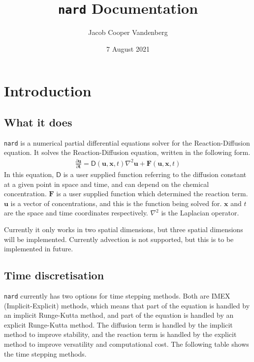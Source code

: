 \documentclass[11pt]{article}
\title{\texttt{nard} Documentation}
\author{Jacob Cooper Vandenberg}
\date{7 August 2021}
\begin{document}
    \maketitle
    \tableofcontents


    \section[Introduction]{Introduction}
    \subsection[What it does]{What it does}
    \texttt{nard} is a numerical partial differential equations solver for the Reaction-Diffusion equation.
    It solves the Reaction-Diffusion equation, written in the following form.
    \begin{gather}
        \frac{\partial \mathbf{u} }{\partial \mathbf{t}} = \mathsf{D}(\mathbf{u}, \mathbf{x}, t)\nabla^2 \mathbf{u} + \mathbf{F}(\mathbf{u}, \mathbf{x}, t)
    \end{gather}
    In this equation, \(\mathsf{D}\) is a user supplied function referring to the diffusion constant at a given point in space and time, and can depend on the chemical concentration. \(\mathbf{F}\) is a user supplied function which determined the reaction term. \(\mathbf{u}\) is a vector of concentrations, and this is the function being solved for. \(\mathbf{x}\) and \(t\) are the space and time coordinates respectively. \(\nabla^2\) is the Laplacian operator.

    Currently it only works in two spatial dimensions, but three spatial dimensions will be implemented.
    Currently advection is not supported, but this is to be implemented in future.


    \subsection{Time discretisation}
    \texttt{nard} currently has two options for time stepping methods. Both are IMEX (Implicit-Explicit) methods, which means that part of the equation is handled by an implicit Runge-Kutta method, and part of the equation is handled by an explicit Runge-Kutta method. The diffusion term is handled by the implicit method to improve stability, and the reaction term is handled by the explicit method to improve versatility and computational cost.
    The following table shows the time stepping methods.
\end{document}
